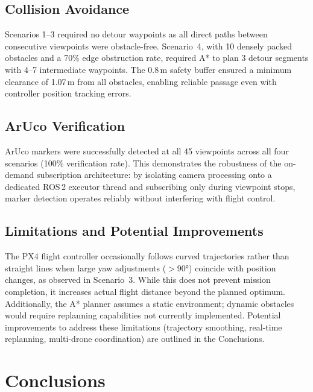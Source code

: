 \documentclass[11pt,a4paper]{article}
\begin{document}
\subsection{Collision Avoidance}

Scenarios 1--3 required no detour waypoints as all direct paths between consecutive viewpoints were obstacle-free. Scenario~4, with 10 densely packed obstacles and a 70\% edge obstruction rate, required A* to plan 3 detour segments with 4--7 intermediate waypoints. The 0.8\,m safety buffer ensured a minimum clearance of 1.07\,m from all obstacles, enabling reliable passage even with controller position tracking errors.

\subsection{ArUco Verification}

ArUco markers were successfully detected at all 45 viewpoints across all four scenarios (100\% verification rate). This demonstrates the robustness of the on-demand subscription architecture: by isolating camera processing onto a dedicated ROS\,2 executor thread and subscribing only during viewpoint stops, marker detection operates reliably without interfering with flight control.

\subsection{Limitations and Potential Improvements}

The PX4 flight controller occasionally follows curved trajectories rather than straight lines when large yaw adjustments ($>90°$) coincide with position changes, as observed in Scenario~3. While this does not prevent mission completion, it increases actual flight distance beyond the planned optimum. Additionally, the A* planner assumes a static environment; dynamic obstacles would require replanning capabilities not currently implemented. Potential improvements to address these limitations (trajectory smoothing, real-time replanning, multi-drone coordination) are outlined in the Conclusions.

\section{Conclusions}
\end{document}
